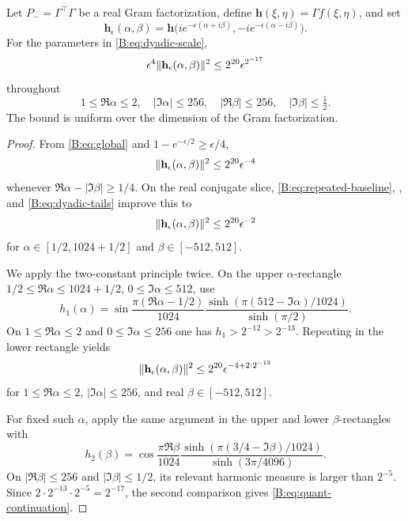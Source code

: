 \begin{lemma}\label{B:lem:quant-continuation}
Let $P_-=\Gamma^\top\Gamma$ be a real Gram factorization, define
$\mathbf h(\xi,\eta)=\Gamma f(\xi,\eta)$, and set
\begin{equation}\label{B:eq:hepsilon}
 \mathbf h_\epsilon(\alpha,\beta)
 =\mathbf h\bigl(ie^{-\epsilon(\alpha+i\beta)},
        -ie^{-\epsilon(\alpha-i\beta)}\bigr).
\end{equation}
For the parameters in \eqref{B:eq:dyadic-scale},
\begin{equation}\label{B:eq:quant-continuation}
 \epsilon^4\lVert\mathbf h_\epsilon(\alpha,\beta)\rVert^2
 \le2^{20}\epsilon^{2^{-17}}
\end{equation}
throughout
\begin{equation}\label{B:eq:speed-region}
 1\le\Re\alpha\le2,\quad |\Im\alpha|\le256,\quad
 |\Re\beta|\le256,\quad |\Im\beta|\le\tfrac12.
\end{equation}
The bound is uniform over the dimension of the Gram factorization.
\end{lemma}

\begin{proof}
From \eqref{B:eq:global} and $1-e^{-\epsilon/2}\ge\epsilon/4$,
\[
 \lVert\mathbf h_\epsilon(\alpha,\beta)\rVert^2
 \le2^{20}\epsilon^{-4}
\]
whenever $\Re\alpha-|\Im\beta|\ge1/4$.  On the real conjugate slice,
\eqref{B:eq:repeated-baseline}, , and
\eqref{B:eq:dyadic-tails} improve this to
\[
 \lVert\mathbf h_\epsilon(\alpha,\beta)\rVert^2
 \le2^{20}\epsilon^{-2}
\]
for $\alpha\in[1/2,1024+1/2]$ and $\beta\in[-512,512]$.

We apply the two-constant principle twice.  On the upper
$\alpha$-rectangle
$1/2\le\Re\alpha\le1024+1/2$, $0\le\Im\alpha\le512$, use
\[
 h_1(\alpha)=\sin\frac{\pi(\Re\alpha-1/2)}{1024}
 \frac{\sinh(\pi(512-\Im\alpha)/1024)}{\sinh(\pi/2)}.
\]
On $1\le\Re\alpha\le2$ and $0\le\Im\alpha\le256$ one has
$h_1>2^{-12}>2^{-13}$.  Repeating in the lower rectangle yields
\[
 \lVert\mathbf h_\epsilon(\alpha,\beta)\rVert^2
 \le2^{20}\epsilon^{-4+2\cdot2^{-13}}
\]
for $1\le\Re\alpha\le2$, $|\Im\alpha|\le256$, and real
$\beta\in[-512,512]$.

For fixed such $\alpha$, apply the same argument in the upper and lower
$\beta$-rectangles with
\[
 h_2(\beta)=\cos\frac{\pi\Re\beta}{1024}
 \frac{\sinh(\pi(3/4-\Im\beta)/1024)}{\sinh(3\pi/4096)}.
\]
On $|\Re\beta|\le256$ and $|\Im\beta|\le1/2$, its relevant harmonic
measure is larger than $2^{-5}$.  Since
$2\cdot2^{-13}\cdot2^{-5}=2^{-17}$, the second comparison gives
\eqref{B:eq:quant-continuation}.
\end{proof}


